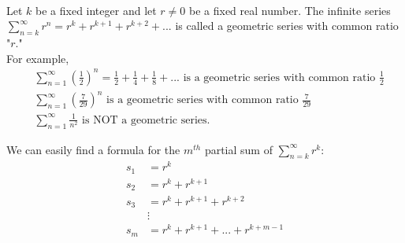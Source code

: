 \begin{definition} \leavevmode \\
    Let $k$ be a fixed integer and let $r \not = 0$ be a fixed real number. The infinite series $\sum_{n=k}^{\infty} r^n = r^k + r^{k+1} + r^{k+2} +...$ is called a geometric series with common ratio "$r$."\\
    For example,
    \begin{align*}
        &\sum_{n=1}^{\infty}\left(\frac{1}{2}\right)^n = \frac{1}{2} + \frac{1}{4} + \frac{1}{8} + ... \text{ is a geometric series with common ratio $\frac{1}{2}$} \\
        &\sum_{n=1}^{\infty} \left(\frac{7}{29}\right)^n \text{ is a geometric series with common ratio $\frac{7}{29}$} \\
        &\sum_{n=1}^{\infty} \frac{1}{n^2} \text{ is NOT a geometric series.}
    \end{align*}
\end{definition}

We can easily find a formula for the $m^{th}$ partial sum of $\sum_{n=k}^{\infty}r^k:$
\begin{align*}
    s_1 &= r^k \\
    s_2 &= r^k + r^{k+1} \\
    s_3 &= r^k + r^{k+1} + r^{k+2} \\
    &\vdots \\
    s_m &= r^k + r^{k+1} + ... + r^{k + m - 1} \tag{$*$}
\end{align*}

